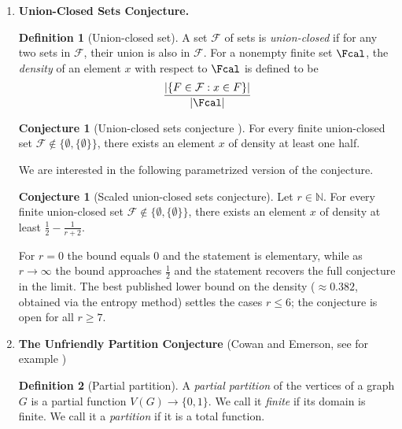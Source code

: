 \documentclass[12pt]{article}
\numberwithin{equation}{section}
\theoremstyle{definition}
\newtheorem{definition}{Definition}
\newtheorem{conjecture}[theorem]{Conjecture}
\begin{document}
\begin{enumerate}
For $r=2$, it is a classical theorem of K\H{o}nig, and for $r=3$ it was proved by Aharoni \cite{AharoniRyserTripartite} using the topological method. 

\newpage
\item \textbf{Union-Closed Sets Conjecture.} 

\begin{definition}[Union-closed set]
A set $\mathcal{F}$ of sets is \textit{union-closed} if for any two sets in $\mathcal{F}$, their union is also in $\mathcal{F}$. 
For a nonempty finite set $\Fcal$, the \emph{density} of an element $x$ with respect to $\Fcal$ is defined
to be 
\[
\frac{|\{ F \in \mathcal{F} : x \in F \}|}{|\Fcal|}
\]
\end{definition}

\begin{conjecture}[Union-closed sets conjecture \mbox{\cite{nagel2023}}]
For every finite union-closed set $\mathcal{F}\notin\{\emptyset, \{\emptyset\}\}$, there exists an element $x$ of density at least one half.
\end{conjecture}

We are interested in the following parametrized version of the conjecture.
\begin{conjecture}[Scaled union-closed sets conjecture]
Let $r\in \mathbb{N}$.
For every finite union-closed set $\mathcal{F}\notin\{\emptyset, \{\emptyset\}\}$, there exists an element $x$ of density at least $\frac{1}{2}-\frac{1}{r+2}$.
\end{conjecture}

For $r=0$ the bound equals $0$ and the statement is elementary, while as $r\to\infty$ the bound approaches $\frac{1}{2}$ and the statement recovers the full conjecture in the limit. The best published lower bound on the density ($\approx 0.382$, obtained via the entropy method) settles the cases $r\leq 6$; the conjecture is open for all $r\geq 7$.






\newpage
\item \textbf{The Unfriendly Partition Conjecture} (Cowan and Emerson, see for example \cite{aharoni1990unfriendly})

\begin{definition}[Partial partition]
A {\em partial partition} of the vertices of a graph $G$ is a partial function $V(G) \to \{0,1\}$. We call it {\em finite} if its domain is finite. We call it a {\em partition} if it is a total function.
\end{definition}


\end{enumerate}
\end{document}
